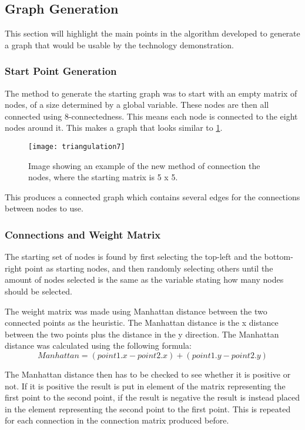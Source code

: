 \subsection{Graph Generation}\label{subsec:graphGen}
	This section will highlight the main points in the algorithm developed to generate a graph that would be usable by the technology demonstration.

\subsubsection{Start Point Generation}
	The method to generate the starting graph was to start with an empty matrix of nodes, of a size determined by a global variable. These nodes are then all connected using 8-connectedness. This means each node is connected to the eight nodes around it. This makes a graph that looks similar to \ref{fig:triangulation7}.

\begin{figure}[H]
	\texttt{[image: triangulation7]}
	\centering
	\caption{Image showing an example of the new method of connection the nodes, where the starting matrix is 5 x 5.}
	\label{fig:triangulation7}
\end{figure}

	This produces a connected graph which contains several edges for the connections between nodes to use.\\

\subsubsection{Connections and Weight Matrix}
	The starting set of nodes is found by first selecting the top-left and the bottom-right point as starting nodes, and then randomly selecting others until the amount of nodes selected is the same as the variable stating how many nodes should be selected.
	\newline
	\par
	The weight matrix was made using Manhattan distance between the two connected points as the heuristic. The Manhattan distance is the x distance between the two points plus the distance in the y direction. The Manhattan distance was calculated using the following formula:\\

	$$Manhattan = (point1.x - point2.x) + (point1.y - point2.y)$$
	
	The Manhattan distance then has to be checked to see whether it is positive or not. If it is positive the result is put in element of the matrix representing the first point to the second point, if the result is negative the result is instead placed in the element representing the second point to the first point. This is repeated for each connection in the connection matrix produced before.


